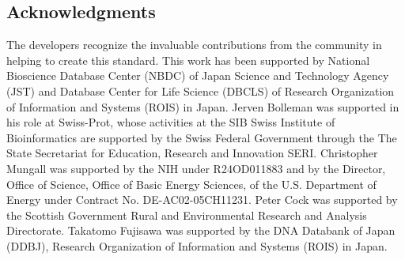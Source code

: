 \documentclass[10pt]{bmc_article}
\newenvironment{bmcformat}{\begin{raggedright}\baselineskip20pt\sloppy\setboolean{publ}{false}}{\end{raggedright}\baselineskip20pt\sloppy}
\begin{document}
\begin{bmcformat}
\section*{Acknowledgments}
The developers recognize the invaluable contributions from the community in helping to create this standard.
This work has been supported by National Bioscience Database Center (NBDC) of Japan Science and Technology Agency (JST) and Database Center for Life Science (DBCLS) of Research Organization of Information and Systems (ROIS) in Japan.
Jerven Bolleman was supported in his role at Swiss-Prot, whose activities at the SIB Swiss Institute of Bioinformatics are supported by the Swiss Federal Government through the The State Secretariat for Education, Research and Innovation SERI.
Christopher Mungall was supported by the NIH under R24OD011883 and by the Director, Office of Science, Office of Basic Energy Sciences, of the U.S. Department of Energy under Contract No. DE-AC02-05CH11231.
Peter Cock was supported by the Scottish Government Rural and Environmental Research and Analysis Directorate.
Takatomo Fujisawa was supported by the DNA Databank of Japan (DDBJ), Research Organization of Information and Systems (ROIS) in Japan.

\newpage
{
   }     %
  
\end{bmcformat}
\end{document}
